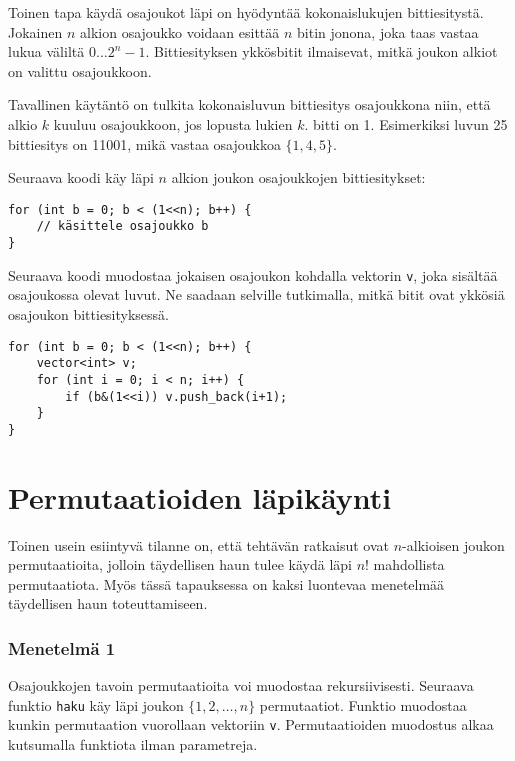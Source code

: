Toinen tapa käydä osajoukot läpi on hyödyntää kokonaislukujen
bittiesitystä. Jokainen $n$ alkion osajoukko
voidaan esittää $n$ bitin jonona,
joka taas vastaa lukua väliltä $0 \ldots 2^n-1$.
Bittiesityksen ykkösbitit ilmaisevat,
mitkä joukon alkiot on valittu osajoukkoon.

Tavallinen käytäntö on tulkita kokonaisluvun
bittiesitys osajoukkona niin,
että alkio $k$ kuuluu osajoukkoon,
jos lopusta lukien $k$. bitti on 1.
Esimerkiksi luvun 25 bittiesitys on 11001,
mikä vastaa osajoukkoa $\{1,4,5\}$.

Seuraava koodi käy läpi $n$ alkion joukon
osajoukkojen bittiesitykset:

\begin{lstlisting}
for (int b = 0; b < (1<<n); b++) {
    // käsittele osajoukko b
}
\end{lstlisting}

Seuraava koodi muodostaa jokaisen osajoukon
kohdalla vektorin \texttt{v},
joka sisältää osajoukossa olevat luvut.
Ne saadaan selville tutkimalla, mitkä bitit ovat
ykkösiä osajoukon bittiesityksessä.

\begin{lstlisting}
for (int b = 0; b < (1<<n); b++) {
    vector<int> v;
    for (int i = 0; i < n; i++) {
        if (b&(1<<i)) v.push_back(i+1);
    }
}
\end{lstlisting}

\section{Permutaatioiden läpikäynti}


Toinen usein esiintyvä tilanne on,
että tehtävän ratkaisut ovat $n$-alkioisen
joukon permutaatioita,
jolloin täydellisen haun tulee
käydä läpi $n!$ mahdollista permutaatiota.
Myös tässä tapauksessa on kaksi luontevaa
menetelmää täydellisen haun toteuttamiseen.

\subsubsection{Menetelmä 1}

Osajoukkojen tavoin permutaatioita voi muodostaa
rekursiivisesti.
Seuraava funktio \texttt{haku} käy läpi
joukon $\{1,2,\ldots,n\}$ permutaatiot.
Funktio muodostaa kunkin permutaation
vuorollaan vektoriin \texttt{v}.
Permutaatioiden muodostus alkaa kutsumalla
funktiota ilman parametreja.

